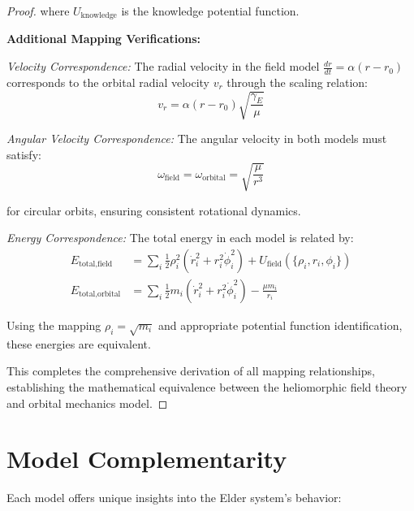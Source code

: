 \begin{proof}
where $U_{\text{knowledge}}$ is the knowledge potential function.

\textbf{Additional Mapping Verifications:}

\emph{Velocity Correspondence:}
The radial velocity in the field model $\frac{dr}{dt} = \alpha(r-r_0)$ corresponds to the orbital radial velocity $v_r$ through the scaling relation:
\begin{equation}
v_r = \alpha(r-r_0)\sqrt{\frac{\gamma_E}{\mu}}
\end{equation}

\emph{Angular Velocity Correspondence:}
The angular velocity in both models must satisfy:
\begin{equation}
\omega_{\text{field}} = \omega_{\text{orbital}} = \sqrt{\frac{\mu}{r^3}}
\end{equation}

for circular orbits, ensuring consistent rotational dynamics.

\emph{Energy Correspondence:}
The total energy in each model is related by:
\begin{align}
E_{\text{total,field}} &= \sum_i \frac{1}{2}\rho_i^2(\dot{r}_i^2 + r_i^2\dot{\phi}_i^2) + U_{\text{field}}(\{\rho_i, r_i, \phi_i\}) \\
E_{\text{total,orbital}} &= \sum_i \frac{1}{2}m_i(\dot{r}_i^2 + r_i^2\dot{\phi}_i^2) - \frac{\mu m_i}{r_i}
\end{align}

Using the mapping $\rho_i = \sqrt{m_i}$ and appropriate potential function identification, these energies are equivalent.

This completes the comprehensive derivation of all mapping relationships, establishing the mathematical equivalence between the heliomorphic field theory and orbital mechanics model.
\end{proof}

\section{Model Complementarity}

Each model offers unique insights into the Elder system's behavior:

